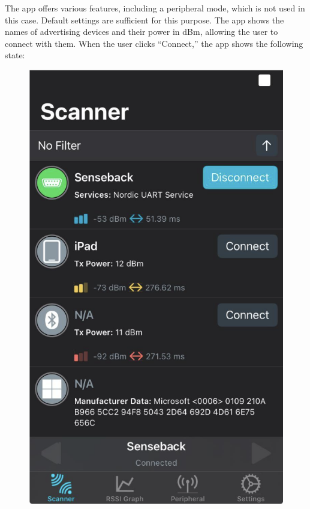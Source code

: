 \documentclass{Configuration_Files/PoliMi3i_thesis}
\begin{document}
The app offers various features, including a peripheral mode, which is not used in this case. Default settings are sufficient for this purpose. The app shows the names of advertising devices and their power in dBm, allowing the user to connect with them. When the user clicks “Connect,” the app shows the following state:

\begin{figure}[H]
    \centering
    \includegraphics[scale=0.3]{Multicentral/7.png}
    \label{fig:nrf_connect_connected}
\end{figure}
\end{document}
